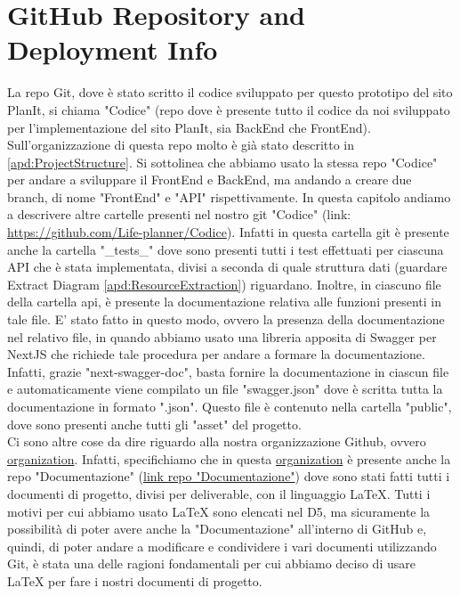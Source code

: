 \section{GitHub Repository and Deployment Info}
\label{secD4:GitHubRepositoryAndDeploymentInfo}
La repo Git, dove è stato scritto il codice sviluppato per questo prototipo del sito PlanIt, si chiama "Codice" (repo dove è presente tutto il codice da noi sviluppato per l'implementazione del sito PlanIt, sia BackEnd che FrontEnd). Sull'organizzazione di questa repo molto è già stato descritto in \ref{apd:ProjectStructure}. Si sottolinea che abbiamo usato la stessa repo "Codice" per andare a sviluppare il FrontEnd e BackEnd, ma andando a creare due branch, di nome "FrontEnd" e "API" rispettivamente. In questa capitolo andiamo a descrivere altre cartelle presenti nel nostro git "Codice" (link: \href{https://github.com/Life-planner/Codice} {https://github.com/Life-planner/Codice}). Infatti in questa cartella git è presente anche la cartella "\_tests\_" dove sono presenti tutti i test effettuati per ciascuna API che è stata implementata, divisi a seconda di quale struttura dati (guardare Extract Diagram \ref{apd:ResourceExtraction}) riguardano. Inoltre, in  ciascuno file della cartella api, è presente la documentazione relativa alle funzioni presenti in tale file. E' stato fatto in questo modo, ovvero la presenza della documentazione nel relativo file, in quando abbiamo usato una libreria apposita di Swagger per NextJS che richiede tale procedura per andare a formare la documentazione. Infatti, grazie "next-swagger-doc", basta fornire la documentazione in ciascun file e automaticamente viene compilato un file "swagger.json" dove è scritta tutta la documentazione in formato ".json". Questo file è contenuto nella cartella "public", dove sono presenti anche tutti gli "asset" del progetto.\\
Ci sono altre cose da dire riguardo alla nostra organizzazione Github, ovvero \href{https://github.com/orgs/Life-planner/repositories}{organization}. Infatti, specifichiamo che in questa \href{https://github.com/orgs/Life-planner/repositories}{organization} è presente anche la repo "Documentazione" (\href{https://github.com/Life-planner/Documentazione}{link repo "Documentazione"}) dove sono stati fatti tutti i documenti di progetto, divisi per deliverable, con il linguaggio LaTeX. Tutti i motivi per cui abbiamo usato LaTeX sono elencati nel D5, ma sicuramente la possibilità di poter avere anche la "Documentazione" all'interno di GitHub e, quindi, di poter andare a modificare e condividere i vari documenti utilizzando Git, è stata una delle ragioni fondamentali per cui abbiamo deciso di usare LaTeX per fare i nostri documenti di progetto. \\
